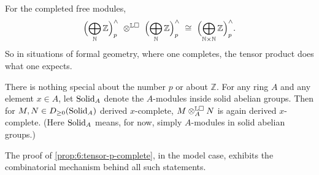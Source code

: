\begin{corollary}
\label{cor:6:completed-sum-tensor}
For the completed free modules,
\begin{equation*}
\Bigl(\bigoplus_{\mathbb{N}}\mathbb{Z}\Bigr)^{\wedge}_{p}
\ \otimes^{\mathbb{L}\square}\
\Bigl(\bigoplus_{\mathbb{N}}\mathbb{Z}\Bigr)^{\wedge}_{p}
\ \cong\
\Bigl(\bigoplus_{\mathbb{N}\times\mathbb{N}}\mathbb{Z}\Bigr)^{\wedge}_{p} .
\end{equation*}
So in situations of formal geometry, where one completes, the tensor product does
what one expects.
\end{corollary}

\begin{remark}
\label{rmk:6:general-ring}
\ts{00:59:21}
There is nothing special about the number $p$ or about $\mathbb{Z}$. For any ring
$A$ and any element $x\in A$, let $\mathrm{Solid}_{A}$ denote the $A$-modules inside solid
abelian groups. Then for $M,N\in D_{\geq0}(\mathrm{Solid}_{A})$ derived $x$-complete,
$M\otimes^{\mathbb{L}\square}_{A}N$ is again derived $x$-complete. (Here
$\mathrm{Solid}_{A}$ means, for now, simply $A$-modules in solid abelian groups.)
\end{remark}

The proof of \cref{prop:6:tensor-p-complete}, in the model case, exhibits the
combinatorial mechanism behind all such statements.

